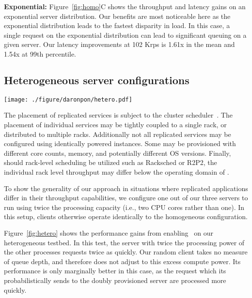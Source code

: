 \noindent\textbf{Exponential:} Figure~\ref{fig:homo}C shows the throughput and
latency gains on an exponential server distribution. Our benefits are most
noticeable here as the exponential distribution leads to the fastest disparity
in load. In this case, a single request on the exponential distribution can
lead to significant queuing on a given server. Our latency improvements at 102
Krps is 1.61x in the mean and 1.54x at 99th percentile.

\subsection{Heterogeneous server configurations}

\begin{figure*}
  \texttt{[image: ./figure/daronpon/hetero.pdf]}

  \caption{Throughput and latency improvements with skewed processing
    capacity in a heterogeneous server configuration. \toolname\
    scales linearly with with the aggregate processing capacity
    available.}

  \label{fig:hetero}
\end{figure*}

The placement of replicated services is subject to the cluster
scheduler~\cite{facebook_shard,google_slicer,microsoft_service_fabric}.  The
placement of individual services may be tightly coupled to a single rack, or
distributed to multiple racks.  Additionally not all replicated services may be
configured using identically powered instances. Some may be provisioned with
different core counts, memory, and potentially different OS versions.  Finally,
should rack-level scheduling be utilized such as Racksched or R2P2, the
individual rack level throughput may differ below the operating domain of
\toolname.

To show the generality of our approach in situations where replicated
applications differ in their throughput capabilities, we configure one out of
our three servers to run using twice the processing capacity (i.e., two CPU
cores rather than one). In this setup, clients otherwise operate identically to
the homogeneous configuration.

Figure~\ref{fig:hetero} shows the performance gains from enabling \toolname\ on
our heterogeneous testbed. In this test, the server with twice the processing
power of the other processes requests twice as quickly.  Our random client
takes no measure of queue depth, and therefore does not adjust to this excess
compute power. Its performance is only marginally better in this case, as the
request which its probabilistically sends to the doubly provisioned server are
processed more quickly. 

